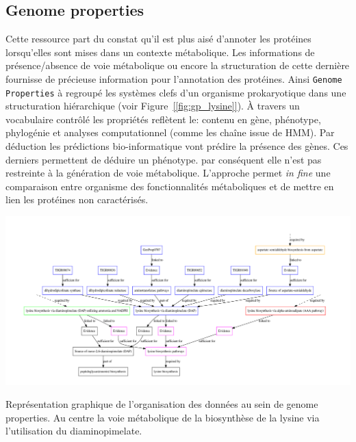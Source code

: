 \begin{refsegment}
    \subsection{Genome properties}
    
    Cette ressource part du constat qu'il est plus aisé d'annoter les protéines lorsqu'elles sont mises dans un contexte métabolique. Les informations de présence/absence de voie métabolique ou encore la structuration de cette dernière fournisse de précieuse information pour l'annotation des protéines. Ainsi \texttt{Genome Properties} \cite{selengut2007tigrfams,haft2005genome,haft2013tigrfams} à regroupé les systèmes clefs d'un organisme prokaryotique dans une structuration hiérarchique (voir Figure~\cref{[fig:gp_lysine]}). À travers un vocabulaire contrôlé les propriétés reflètent le: contenu en gène, phénotype, phylogénie et analyses computationnel (comme les chaîne issue de \acrfull{HMM}). Par déduction les prédictions bio-informatique vont prédire la présence des gènes. Ces derniers permettent de déduire un phénotype. par conséquent elle n'est pas restreinte à la génération de voie métabolique. L'approche permet \textit{in fine} une comparaison entre organisme des fonctionnalités métaboliques et de mettre en lien les protéines non caractérisés.
    
    \begin{shadedfigure}[H]
        \centering
        \includegraphics[width=\textwidth]{img/lysine_biosynthesis.pdf}
        \caption{ Représentation graphique de l'organisation des données au sein de genome properties. Au centre la voie métabolique de la biosynthèse de la lysine via l'utilisation du diaminopimelate. }
        \label{fig:gp_lysine}
    \end{shadedfigure}


\end{refsegment}
